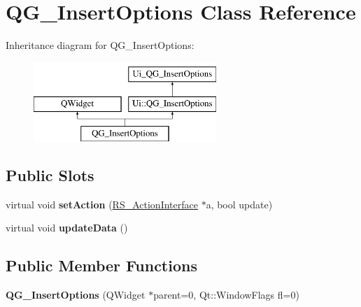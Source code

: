 \hypertarget{classQG__InsertOptions}{\section{Q\-G\-\_\-\-Insert\-Options Class Reference}
\label{classQG__InsertOptions}
}
Inheritance diagram for Q\-G\-\_\-\-Insert\-Options\-:\begin{figure}[H]
\begin{center}
\leavevmode
\includegraphics[height=3.000000cm]{classQG__InsertOptions}
\end{center}
\end{figure}
\subsection*{Public Slots}
\begin{DoxyCompactItemize}
\item 
\hypertarget{classQG__InsertOptions_ac6c96301bef2dac2c7882cba8661ebfa}{virtual void {\bfseries set\-Action} (\hyperlink{classRS__ActionInterface}{R\-S\-\_\-\-Action\-Interface} $\ast$a, bool update)}\label{classQG__InsertOptions_ac6c96301bef2dac2c7882cba8661ebfa}

\item 
\hypertarget{classQG__InsertOptions_a3e039d8669d5dcc3f09dc92a3017b961}{virtual void {\bfseries update\-Data} ()}\label{classQG__InsertOptions_a3e039d8669d5dcc3f09dc92a3017b961}

\end{DoxyCompactItemize}
\subsection*{Public Member Functions}
\begin{DoxyCompactItemize}
\item 
\hypertarget{classQG__InsertOptions_a73f756b637b4eeaa48942eb544d80561}{{\bfseries Q\-G\-\_\-\-Insert\-Options} (Q\-Widget $\ast$parent=0, Qt\-::\-Window\-Flags fl=0)}\label{classQG__InsertOptions_a73f756b637b4eeaa48942eb544d80561}

\end{DoxyCompactItemize}
